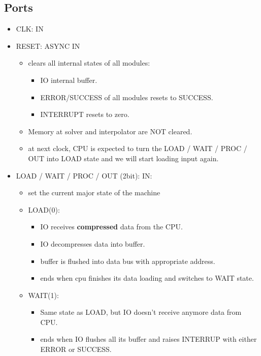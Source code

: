 \documentclass[12pt]{report}
\begin{document}
\subsection{Ports}\label{sec:interface:ports}
\begin{itemize}
    \item CLK: IN
    \item RESET: ASYNC IN
    \begin{itemize}
        \item clears all internal states of all modules:
        \begin{itemize}
            \item IO internal buffer.
            \item ERROR/SUCCESS of all modules resets to SUCCESS.
            \item INTERRUPT resets to zero.
        \end{itemize}
        \item Memory at solver and interpolator are NOT cleared.
        \item at next clock, CPU is expected to turn the {LOAD / WAIT / PROC / OUT} into {LOAD} state and we will start loading input again.
    \end{itemize}
    \item LOAD / WAIT / PROC / OUT (2bit): IN:
    \begin{itemize}
        \item set the current major state of the machine
        \item LOAD(0):
        \begin{itemize}
            \item IO receives \textbf{compressed} data from the CPU.
            \item IO decompresses data into buffer.
            \item buffer is flushed into data bus with appropriate address.
            \item ends when cpu finishes its data loading and switches to {WAIT} state.
        \end{itemize}
        \item WAIT(1):
        \begin{itemize}
            \item Same state as {LOAD}, but IO doesn't receive anymore data from CPU.
            \item ends when IO flushes all its buffer and raises {INTERRUP} with either {ERROR} or {SUCCESS}.
        \end{itemize}

\end{itemize}
\end{itemize}
\end{document}
